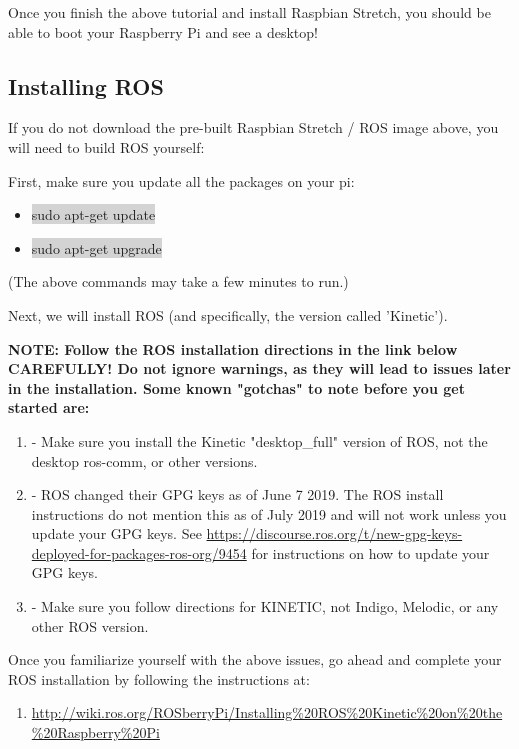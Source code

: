 \documentclass{article}
\begin{document}
\noindent Once you finish the above tutorial and install Raspbian Stretch, you should be able to boot your Raspberry Pi and see a desktop!

\subsection{Installing ROS}
If you do not download the pre-built Raspbian Stretch / ROS image above, you will need to build ROS yourself:

First, make sure you update all the packages on your pi:
\begin{itemize}
	\item[] \colorbox{lightgray}{sudo apt-get update}
	\item[] \colorbox{lightgray}{sudo apt-get upgrade}
\end{itemize} 
(The above commands may take a few minutes to run.)

\bigskip

\noindent Next, we will install ROS (and specifically, the version called 'Kinetic').

\textbf{NOTE: Follow the ROS installation directions in the link below CAREFULLY!  Do not ignore warnings, as they will lead to issues later in the installation.  Some known "gotchas" to note before you get started are:}
\begin{enumerate}
	\item[] - Make sure you install the Kinetic "desktop\_full" version of ROS, not the desktop ros-comm, or other versions.
	\item[] - ROS changed their GPG keys as of June 7 2019.  The ROS install instructions do not mention this as of July 2019 and will not work unless you update your GPG keys. See \href{https://discourse.ros.org/t/new-gpg-keys-deployed-for-packages-ros-org/9454}{https://discourse.ros.org/t/new-gpg-keys-deployed-for-packages-ros-org/9454} for instructions on how to update your GPG keys. 
	\item[] - Make sure you follow directions for KINETIC, not Indigo, Melodic, or any other ROS version. 
\end{enumerate}

\noindent Once you familiarize yourself with the above issues, go ahead and complete your ROS installation by following the instructions at:
\begin{enumerate}
	\item[] \href{http://wiki.ros.org/ROSberryPi/Installing%20ROS%20Kinetic%20on%20the%20Raspberry%20Pi}{http://wiki.ros.org/ROSberryPi/Installing\%20ROS\%20Kinetic\%20on\%20the\%20Raspberry\%20Pi}
\end{enumerate}
\end{document}
